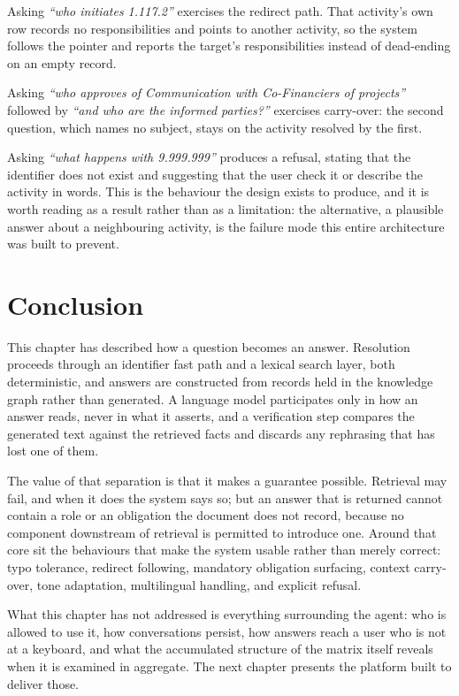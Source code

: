 Asking \textit{``who initiates 1.117.2''} exercises the redirect path. That activity's own
row records no responsibilities and points to another activity, so the system follows the
pointer and reports the target's responsibilities instead of dead-ending on an empty
record.

Asking \textit{``who approves of Communication with Co-Financiers of projects''} followed
by \textit{``and who are the informed parties?''} exercises carry-over: the second
question, which names no subject, stays on the activity resolved by the first.

Asking \textit{``what happens with 9.999.999''} produces a refusal, stating that the
identifier does not exist and suggesting that the user check it or describe the activity
in words. This is the behaviour the design exists to produce, and it is worth reading as a
result rather than as a limitation: the alternative, a plausible answer about a
neighbouring activity, is the failure mode this entire architecture was built to prevent.

\section*{Conclusion}

This chapter has described how a question becomes an answer. Resolution proceeds through
an identifier fast path and a lexical search layer, both deterministic, and answers are
constructed from records held in the knowledge graph rather than generated. A language
model participates only in how an answer reads, never in what it asserts, and a
verification step compares the generated text against the retrieved facts and discards any
rephrasing that has lost one of them.

The value of that separation is that it makes a guarantee possible. Retrieval may fail,
and when it does the system says so; but an answer that is returned cannot contain a role
or an obligation the document does not record, because no component downstream of
retrieval is permitted to introduce one. Around that core sit the behaviours that make the
system usable rather than merely correct: typo tolerance, redirect following, mandatory
obligation surfacing, context carry-over, tone adaptation, multilingual handling, and
explicit refusal.

What this chapter has not addressed is everything surrounding the agent: who is allowed to
use it, how conversations persist, how answers reach a user who is not at a keyboard, and
what the accumulated structure of the matrix itself reveals when it is examined in
aggregate. The next chapter presents the platform built to deliver those.
